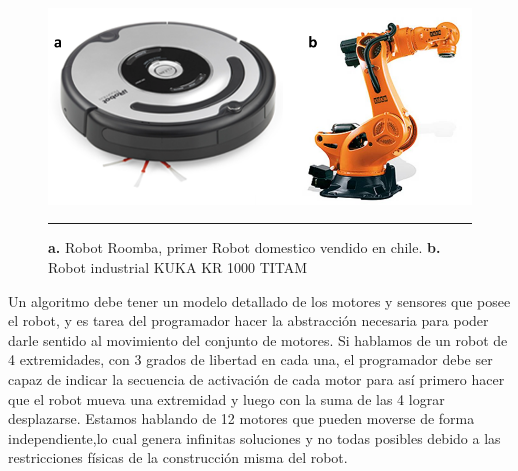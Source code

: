 \begin{figure}[htbp]
	\centering
		\includegraphics[width=\textwidth]{./Figures/RobotsInd.png}
		\rule{35em}{0.5pt}
	\caption[Robots Roomba y KUKA]{\textbf{a. }Robot Roomba, primer Robot domestico vendido en chile. \textbf{b.} Robot industrial KUKA KR 1000 TITAM}
	\label{fig:Roomba y KUKA}
\end{figure}

Un algoritmo debe tener un modelo detallado de los motores y sensores que posee el robot, y es tarea del programador hacer la abstracción necesaria para poder darle sentido al movimiento del conjunto de motores. Si hablamos de un robot de 4 extremidades, con 3 grados de libertad en cada una, el programador debe ser capaz de indicar la secuencia de activación de cada motor para así  primero hacer que el robot mueva una extremidad y luego con la suma de las 4 lograr desplazarse. Estamos hablando de 12 motores que pueden moverse de forma independiente,lo cual genera infinitas soluciones y no todas posibles debido a las restricciones físicas de la construcción misma del robot.



